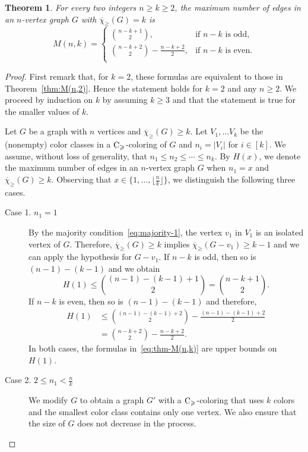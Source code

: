 \documentclass{article}
\newtheorem{theorem}{Theorem}
\theoremstyle{definition}
\newcommand{\mc}{\overline{\chi}_{\geqslant}}
\newcommand{\cg}{{\rm C}_{\geqslant}}
\begin{document}
   \begin{theorem} \label{thm:M(n,k)}
       For every two integers $n \ge k \ge 2$, the maximum number of edges in an $n$-vertex graph $G$ with $\mc(G) =k$ is 
      \begin{equation} \label{eq:thm-M(n,k)}
    M(n,k)= 
    \begin{cases}
	{n-k+1 \choose 2 }, &\text{if $n-k$ is odd},\\
	{n-k+2 \choose 2 }- \frac{n-k+2}{2}, &\text{if $n-k$ is even}.\\
    \end{cases}
    \end{equation}
   \end{theorem}
   \begin{proof}
   First remark that, for $k=2$, these formulas are equivalent to those in Theorem~\ref{thm:M(n,2)}. Hence the statement holds for $k=2$ and any $n \ge 2$. We proceed by induction on $k$ by assuming  $k\ge 3$ and that the statement is true for the smaller values of $k$. 
   
   Let $G$ be a graph with $n$ vertices and $\mc(G) \ge k$. Let $V_1, \dots V_k$ be the (nonempty) color classes in a $\cg$-coloring of $G$ and $n_i=|V_i|$ for $i \in [k]$. We assume, without loss of generality, that $n_1 \leq n_2 \leq \cdots \leq n_k$. By $H(x)$, we denote the maximum number of edges in an $n$-vertex graph $G$ when $n_1=x$ and $\mc(G) \ge k$. Observing that $x \in \{1, \dots , \lfloor \frac{n}{k} \rfloor \}$, we distinguish the following three cases. 
   \begin{description}
       \item[Case 1. $n_1=1$] 
       By the majority condition~\eqref{eq:majority-1}, the vertex $v_1$ in $V_1$ is an isolated vertex of $G$. Therefore, $\mc(G) \ge k$ implies $\mc(G-v_1) \ge k-1$ and we can apply the hypothesis for $G-v_1$. If $n-k$ is odd, then so is $(n-1)-(k-1)$ and we obtain
       $$H(1) \leq {(n-1)- (k-1) +1 \choose 2}= {n-k+1 \choose 2}.
       $$
       If $n-k$ is even, then so is $(n-1)-(k-1)$ and therefore,
       \begin{align*}
           H(1) &\leq {(n-1)- (k-1) +2 \choose 2}- \frac{(n-1)-(k-1)+2}{2}\\
       &= {n-k+2 \choose 2 }- \frac{n-k+2}{2}.
       \end{align*}
         In both cases, the formulas in~\eqref{eq:thm-M(n,k)} are upper bounds on $H(1)$.  
       \item[Case 2. $2 \leq n_1 <\frac{n}{k}$]  
       We modify $G$ to obtain a graph $G'$ with a $\cg$-coloring that uses $k$ colors and the smallest color class contains only one vertex. We also ensure that the size of $G$ does not decrease in the process.


\end{description}
\end{proof}
\end{document}
